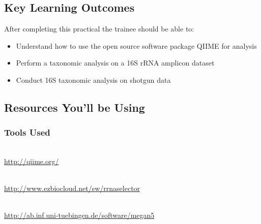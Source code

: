 

\chapter{\moduleTitle}
\newpage

\section{Key Learning Outcomes}

After completing this practical the trainee should be able to:
\begin{itemize}
  \item Understand how to use the open source software package QIIME for analysis
  \item Perform a taxonomic analysis on a 16S rRNA amplicon dataset
  \item Conduct 16S taxonomic analysis on shotgun data 
\end{itemize}

\section{Resources You'll be Using}
 
\subsection{Tools Used}

\begin{description}[style=multiline,labelindent=0cm,align=left,leftmargin=0.5cm]
  \item [QIIME ]\hfill\\
    \url{http://qiime.org/}
  \item [rRNASelector ]\hfill\\
    \url{http://www.ezbiocloud.net/sw/rrnaselector}
  \item [MEGAN ]\hfill\\
    \url{http://ab.inf.uni-tuebingen.de/software/megan5}  	
\end{description}

